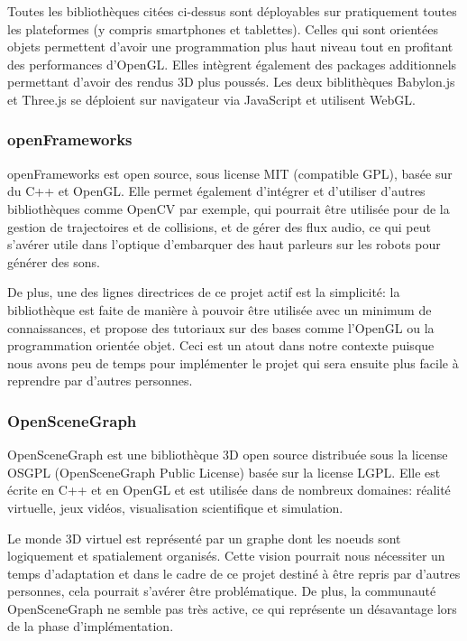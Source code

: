 Toutes les bibliothèques citées ci-dessus sont déployables sur pratiquement toutes les plateformes (y compris smartphones et tablettes). Celles qui sont orientées objets permettent d'avoir une programmation plus haut niveau tout en profitant des performances d'OpenGL. Elles intègrent également des packages additionnels permettant d'avoir des rendus 3D plus poussés. Les deux biblithèques Babylon.js et Three.js se déploient sur navigateur via JavaScript et utilisent WebGL.


\subsubsection{openFrameworks}

openFrameworks est open source, sous license MIT (compatible GPL), basée sur du C++ et OpenGL. Elle permet également d'intégrer et d'utiliser d'autres bibliothèques comme OpenCV par exemple, qui pourrait être utilisée pour de la gestion de trajectoires et de collisions, et de gérer des flux audio, ce qui peut s'avérer utile dans l'optique d'embarquer des haut parleurs sur les robots pour générer des sons. 

De plus, une des lignes directrices de ce projet actif est la simplicité: la bibliothèque est faite de manière à pouvoir être utilisée avec un minimum de connaissances, et propose des tutoriaux sur des bases comme l'OpenGL ou la programmation orientée objet. Ceci est un atout dans notre contexte puisque nous avons peu de temps pour implémenter le projet qui sera ensuite plus facile à reprendre par d'autres personnes.

\subsubsection{OpenSceneGraph}

OpenSceneGraph est une bibliothèque 3D open source distribuée sous la license OSGPL (OpenSceneGraph Public License) basée sur la license LGPL. Elle est écrite en C++ et en OpenGL et est utilisée dans de nombreux domaines: réalité virtuelle, jeux vidéos, visualisation scientifique et simulation. 

Le monde 3D virtuel est représenté par un graphe dont les noeuds sont logiquement et spatialement organisés. Cette vision pourrait nous nécessiter un temps d'adaptation et dans le cadre de ce projet destiné à être repris par d'autres personnes, cela pourrait s'avérer être problématique. De plus, la communauté OpenSceneGraph ne semble pas très active, ce qui représente un désavantage lors de la phase d'implémentation.

